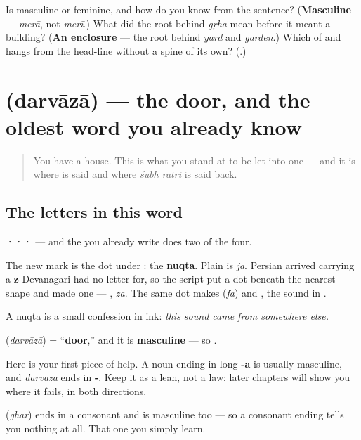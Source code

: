 \begin{tcolorbox}[breakable,colback=teal!4,colframe=teal!35!black,title={Before you move on}]
Is \textbf{} masculine or feminine, and how do you know from the sentence? (\textbf{Masculine} — \emph{merā}, not \emph{merī}.) What did the root behind \emph{gṛha} mean before it meant a building? (\textbf{An enclosure} — the root behind \emph{yard} and \emph{garden}.) Which of \textbf{} and \textbf{} hangs from the head-line without a spine of its own? (\textbf{}.)
\end{tcolorbox}
\section[\texorpdfstring{\hi{दरवाज़ा} (darvāzā)}{दरवाज़ा (darvāzā)}]{ (darvāzā) — the door, and the oldest word you already know}

\label{lesson:HI-C36-darvaaza}



\begin{quote}
You have a house. This is what you stand at to be let into one — and it is where \textbf{} is said and where \emph{śubh rātri} is said back.
\end{quote}

\subsection*{The letters in this word}
\textbf{···} — and the \textbf{} you already write does two of the four.

The new mark is the dot under \textbf{}: the \textbf{nuqta}. Plain \textbf{} is \emph{ja}. Persian arrived carrying a \textbf{z} Devanagari had no letter for, so the script put a dot beneath the nearest shape and made one — \textbf{}, \emph{za}. The same dot makes \textbf{} (\emph{fa}) and \textbf{}, the sound in \textbf{}.

A nuqta is a small confession in ink: \emph{this sound came from somewhere else.}

\begin{grammarlens}[title={Grammar Lens: the shape that usually tells you}]
\textbf{} (\emph{darvāzā}) = \textquotedblleft{}\textbf{door},\textquotedblright{} and it is \textbf{masculine} — so \textbf{ }.

Here is your first piece of help. A noun ending in long \textbf{-ā} is usually masculine, and \emph{darvāzā} ends in \textbf{-}. Keep it as a lean, not a law: later chapters will show you where it fails, in both directions.

\textbf{} (\emph{ghar}) ends in a consonant and is masculine too — so a consonant ending tells you nothing at all. That one you simply learn.
\end{grammarlens}

